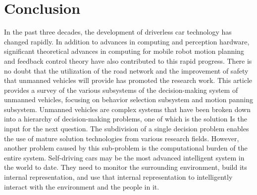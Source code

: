 \documentclass[conference]{IEEEtran}
\begin{document}
\section{Conclusion}
In the past three decades, the development of driverless car technology has changed rapidly. In addition to advances in computing and perception hardware, significant theoretical advances in computing for mobile robot motion planning and feedback control theory have also contributed to this rapid progress. There is no doubt that the utilization of the road network and the improvement of safety that unmanned vehicles will provide has promoted the research work. This article provides a survey of the various subsystems of the decision-making system of unmanned vehicles, focusing on behavior selection subsystem and motion panning subsystem. Unmanned vehicles are complex systems that have been broken down into a hierarchy of decision-making problems, one of which is the solution  Is the input for the next question. The subdivision of a single decision problem enables the use of mature solution technologies from various research fields. However, another problem caused by this sub-problem is the computational burden of the entire system.  Self-driving cars may be the most advanced intelligent system in the world to date.  They need to monitor the surrounding environment, build its internal representation, and use that internal representation to intelligently interact with the environment and the people in it.



 
\end{document}
